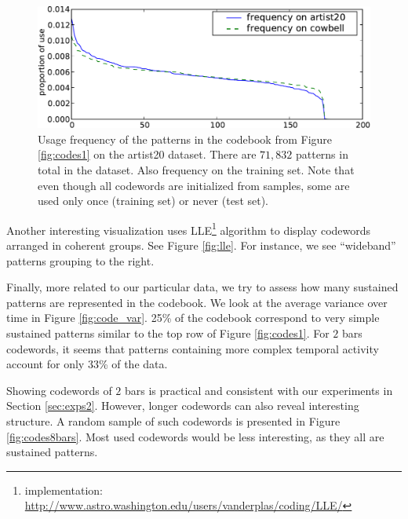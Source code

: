 \documentclass{article}
\begin{document}
\begin{figure}[htb]
\begin{center}
\includegraphics[width=.99\columnwidth]{freqs}
\end{center}
\caption{\small{Usage frequency of the patterns in the codebook from
Figure \ref{fig:codes1} on the artist20 dataset.  There are $71,832$
patterns in total in the dataset. Also frequency on the training set.
Note that even though all codewords are initialized from samples, some
are used only once (training set) or never (test set).
}}
\label{fig:freqs}
\end{figure}

Another interesting visualization uses LLE\footnote{implementation:
  \url{http://www.astro.washington.edu/users/vanderplas/coding/LLE/}}
algorithm \cite{Roweis2000} to display codewords arranged in
coherent groups. See Figure \ref{fig:lle}. For instance, we see
``wideband'' patterns grouping to the right.

Finally, more related to our particular data, we try to assess how many
sustained patterns are represented in the codebook. We look at
the average variance over time in Figure \ref{fig:code_var}.
25\% of the codebook correspond
to very simple sustained patterns similar to the top row of Figure
\ref{fig:codes1}. For $2$ bars codewords, it seems that patterns
containing more complex temporal activity account for only $33$\% of
the data.

Showing codewords of $2$ bars is practical and consistent with our experiments
in Section \ref{sec:exps2}. However, longer codewords can also reveal
interesting structure. A random sample of such codewords is presented
in Figure \ref{fig:codes8bars}. Most used codewords would be less interesting,
as they all are sustained patterns.
\end{document}
